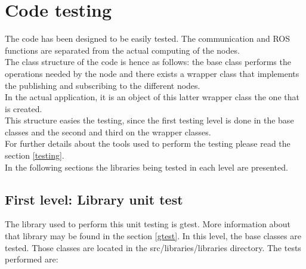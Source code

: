 \section{Code testing}
The code has been designed to be easily tested. The communication and ROS functions are separated from the actual computing of the nodes. 
\\

The class structure of the code is hence as follows: the base class performs the operations needed by the node and there exists a wrapper class that implements the publishing and subscribing to the different nodes. \\

In the actual application, it is an object of this latter wrapper class the one that is created. 
\\

This structure easies the testing, since the first testing level is done in the base classes and the second and third on the wrapper classes.
\\

For further details about the tools used to perform the testing please read the section \ref{testing}.
\\

In the following sections the libraries being tested in each level are presented. 

	\subsection{First level: Library unit test}
		The library used to perform this unit testing is gtest. More information about that library may be found in the section \ref{gtest}.
		In this level, the base classes are tested. Those classes are located in the src/libraries/libraries directory. The tests performed are: 



